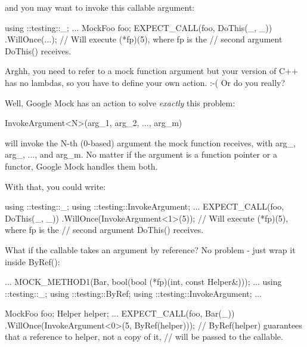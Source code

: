 and you may want to invoke this callable argument\+:


\begin{DoxyCode}
using ::testing::\_;
...
  MockFoo foo;
  EXPECT\_CALL(foo, DoThis(\_, \_))
      .WillOnce(...);
  \textcolor{comment}{// Will execute (*fp)(5), where fp is the}
  \textcolor{comment}{// second argument DoThis() receives.}
\end{DoxyCode}


Arghh, you need to refer to a mock function argument but your version of C++ has no lambdas, so you have to define your own action. \+:-\/( Or do you really?

Well, Google Mock has an action to solve {\itshape exactly} this problem\+:


\begin{DoxyCode}
InvokeArgument<N>(arg\_1, arg\_2, ..., arg\_m)
\end{DoxyCode}


will invoke the {\ttfamily N}-\/th (0-\/based) argument the mock function receives, with {\ttfamily arg\+\_}, {\ttfamily arg\+\_}, ..., and {\ttfamily arg\+\_\+m}. No matter if the argument is a function pointer or a functor, Google Mock handles them both.

With that, you could write\+:


\begin{DoxyCode}
using ::testing::\_;
using ::testing::InvokeArgument;
...
  EXPECT\_CALL(foo, DoThis(\_, \_))
      .WillOnce(InvokeArgument<1>(5));
  \textcolor{comment}{// Will execute (*fp)(5), where fp is the}
  \textcolor{comment}{// second argument DoThis() receives.}
\end{DoxyCode}


What if the callable takes an argument by reference? No problem -\/ just wrap it inside {\ttfamily By\+Ref()}\+:


\begin{DoxyCode}
...
  MOCK\_METHOD1(Bar, \textcolor{keywordtype}{bool}(\textcolor{keywordtype}{bool} (*fp)(\textcolor{keywordtype}{int}, \textcolor{keyword}{const} Helper&)));
...
using ::testing::\_;
using ::testing::ByRef;
using ::testing::InvokeArgument;
...

  MockFoo foo;
  Helper helper;
  ...
  EXPECT\_CALL(foo, Bar(\_))
      .WillOnce(InvokeArgument<0>(5, ByRef(helper)));
  \textcolor{comment}{// ByRef(helper) guarantees that a reference to helper, not a copy of it,}
  \textcolor{comment}{// will be passed to the callable.}
\end{DoxyCode}


